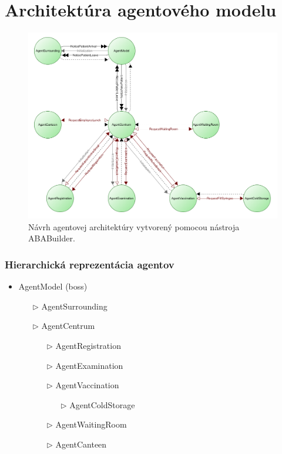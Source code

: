 \documentclass[letterpaper]{article}
\let\stdsection\section							%
\renewcommand\section{\newpage\stdsection}		%
\begin{document}
	\section{Architektúra agentového modelu}
	
	\begin{figure}[hbt!]
		\centering
		\includegraphics[width=\textwidth]{src/aba_architecture}
		\caption{Návrh agentovej architektúry vytvorený pomocou nástroja ABABuilder.}
	\end{figure}

	\subsubsection*{Hierarchická reprezentácia agentov}
	\begin{itemize}
		\item AgentModel (boss)
		\begin{itemize}
			\item[$	\triangleright $] AgentSurrounding
			\item[$	\triangleright $] AgentCentrum
			\begin{itemize}
				\item[$	\triangleright $] AgentRegistration
				\item[$	\triangleright $] AgentExamination
				\item[$	\triangleright $] AgentVaccination
				\begin{itemize}
					\item[$	\triangleright $] AgentColdStorage
				\end{itemize}
				\item[$	\triangleright $] AgentWaitingRoom
				\item[$	\triangleright $] AgentCanteen
			\end{itemize}
		\end{itemize}
	\end{itemize}
	
\end{document}
